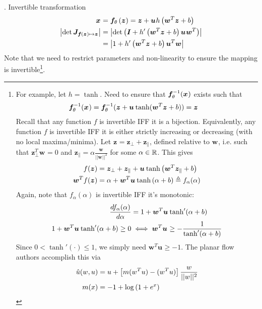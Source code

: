 \documentclass[11pt]{article}
\renewcommand\vec[2][]{\bm{#2}_{#1}}
\newcommand\myspace[1][]{\vspace{#1\bigskipamount}\Needspace{10\baselineskip}}
\newcommand\p{\Needspace{10\baselineskip} \noindent}
\newcommand\bluesec[1]{\myspace \p \blue{#1}}
\begin{document}
\bluesec{Planar Flows}. Invertible transformation
\begin{align}
\vec x 
&= \vecfn[\theta]{f}{z}
= \vec z + \vec u  h\lr{ \innerprod{w}{z} + b  } \\
\left| \det \matr[\vecfn{f}{z} \mapsto \vec z]{J}  \right|
&= \left| \det \lr{ \matr I + h'\lr{ \vec{w}^T \vec z + b }  \vec u \vec{w}^T } \right| \\
&= \left|  1 + h'\lr{ \vec{w}^T \vec z + b }   \vec{u}^T \vec{w}\right|
\end{align}
Note that we need to restrict parameters and non-linearity to ensure the mapping is invertible\footnote{
	For example, let $h = \tanh$. Need to ensure that $\vinv[\theta]{f}(\vec x)$ exists such that
	\begin{align}
	\vinv[\theta]{f}(\vec x) = \vinv[\theta]{f}(\vec z + \vec u \tanh(\vec{w}^T \vec z + b)) &= \vec z
	\end{align} 
	Recall that any function $f$ is invertible IFF it is a bijection. Equivalently, any function $f$ is invertible IFF it is either strictly increasing or decreasing (with no local maxima/minima). Let $\vec z = \vec[\perp]{z} + \vec[\parallel]{z}$, defined relative to $\vec w$, i.e. such that $\vec[\perp]{z}^T \vec w = 0$ and $\vec[\parallel]{z} = \alpha \frac{\vec w}{|| \vec w||^2}$ for some $\alpha \in \mathbb{R}$. This gives
	\begin{align}
	f(\vec z)
	&= \vec[\perp]{z} + \vec[\parallel]{z} + \vec u \tanh \lr{ \vec{w}^T\vec[\parallel]{z} + b  } \\
	\vec{w}^T f(\vec z)
	&= \alpha + \vec{w}^T \vec u \tanh \lr{ \alpha + b  } \triangleq f_{\alpha}(\alpha)
	\end{align}
	Again, note that $f_{\alpha}(\alpha)$ is invertible IFF it's monotonic:
	\begin{align}
	\deriv{f_{\alpha}(\alpha)}{\alpha}
	&= 1 + \vec{w}^T \vec u \tanh ' (\alpha + b) \\
	1 + \vec{w}^T \vec u \tanh ' (\alpha + b) \ge 0 
	&\iff \vec{w}^T \vec u \ge - \inv{\tanh ' (\alpha + b)} 
	\end{align}
	Since $0 < \tanh' (\cdot) \le 1$, we simply need $\vec{w}^T \vec u \ge -1$. The planar flow authors accomplish this via
	\begin{align}
	\hat{u}(w, u)
	&= u + \left[ m(w^T u ) - (w^T u) \right] \frac{w}{||w||^2} \\
	m(x)
	&= -1 + \log \left( 1 + e^x \right)
	\end{align}
}.
\end{document}
